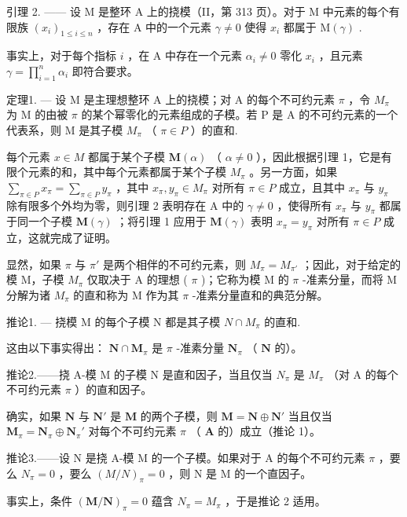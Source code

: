 引理 2. —— 设 M 是整环 A 上的挠模（II，第 313 页）。对于 M 中元素的每个有限族 \((x_{i})_{1 \leq i \leq n}\) ，存在 A 中的一个元素 \(\gamma \neq 0\) 使得 \(x_{i}\) 都属于 \(\mathrm{M}(\gamma)\) .

事实上，对于每个指标 \(i\) ，在 A 中存在一个元素 \(\alpha_{i} \neq 0\) 零化 \(x_{i}\) ，且元素 \(\gamma = \prod_{i=1}^{n} \alpha_{i}\) 即符合要求。

定理1. --- 设 M 是主理想整环 A 上的挠模；对 A 的每个不可约元素 \(\pi\) ，令 \(M_{\pi}\) 为 M 的由被 \(\pi\) 的某个幂零化的元素组成的子模。若 P 是 A 的不可约元素的一个代表系，则 M 是其子模 \(M_{\pi}\) （ \(\pi \in P\) ）的直和.

每个元素 \(x \in M\) 都属于某个子模 \(\mathbf{M}(\alpha)\) （ \(\alpha \neq 0\) ），因此根据引理 1，它是有限个元素的和，其中每个元素都属于某个子模 \(M_{\pi}\) 。另一方面，如果 \(\sum_{\pi \in P} x_{\pi} = \sum_{\pi \in P} y_{\pi}\) ，其中 \(x_{\pi}, y_{\pi} \in M_{\pi}\) 对所有 \(\pi \in P\) 成立，且其中 \(x_{\pi}\) 与 \(y_{\pi}\) 除有限多个外均为零，则引理 2 表明存在 A 中的 \(\gamma \neq 0\) ，使得所有 \(x_{\pi}\) 与 \(y_{\pi}\) 都属于同一个子模 \(\mathbf{M}(\gamma)\) ；将引理 1 应用于 \(\mathbf{M}(\gamma)\) 表明 \(x_{\pi} = y_{\pi}\) 对所有 \(\pi \in P\) 成立，这就完成了证明。

显然，如果 \(\pi\) 与 \(\pi'\) 是两个相伴的不可约元素，则 \(M_{\pi} = M_{\pi'}\) ；因此，对于给定的模 M，子模 \(M_{\pi}\) 仅取决于 A 的理想 ( \(\pi\) )；它称为模 M 的 \(\pi\) -准素分量，而将 M 分解为诸 \(M_{\pi}\) 的直和称为 M 作为其 \(\pi\) -准素分量直和的典范分解。

推论1. --- 挠模 M 的每个子模 N 都是其子模 \(N \cap M_{\pi}\) 的直和.

这由以下事实得出： \(\mathbf{N} \cap \mathbf{M}_{\pi}\) 是 \(\pi\) -准素分量 \(\mathbf{N}_{\pi}\) （ \(\mathbf{N}\) 的）。

推论2.——挠 A-模 M 的子模 N 是直和因子，当且仅当 \(N_{\pi}\) 是 \(M_{\pi}\) （对 A 的每个不可约元素 \(\pi\) ）的直和因子。

确实，如果 \(\mathbf{N}\) 与 \(\mathbf{N}'\) 是 \(\mathbf{M}\) 的两个子模，则 \(\mathbf{M} = \mathbf{N} \oplus \mathbf{N}'\) 当且仅当 \(\mathbf{M}_{\pi} = \mathbf{N}_{\pi} \oplus \mathbf{N}_{\pi}'\) 对每个不可约元素 \(\pi\) （ \(\mathbf{A}\) 的）成立（推论 1）。

推论3.——设 N 是挠 A-模 M 的一个子模。如果对于 A 的每个不可约元素 \(\pi\) ，要么 \(N_{\pi} = 0\) ，要么 \((M/N)_{\pi} = 0\) ，则 N 是 M 的一个直因子。

事实上，条件 \((\mathbf{M}/\mathbf{N})_{\pi}=0\) 蕴含 \(N_{\pi}=M_{\pi}\) ，于是推论 2 适用。

